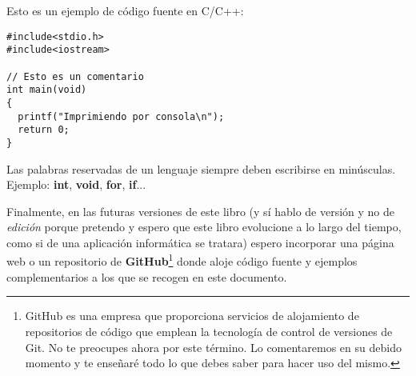 \begin{ejemplo}
Esto es un ejemplo de código fuente en C/C++:
\begin{lstlisting}
#include<stdio.h>
#include<iostream>
    
// Esto es un comentario
int main(void)
{
  printf("Imprimiendo por consola\n");
  return 0;
}
\end{lstlisting}
\end{ejemplo}

\begin{consejo}
Las palabras reservadas de un lenguaje siempre deben escribirse en minúsculas. Ejemplo: \textbf{int}, \textbf{void}, \textbf{for}, \textbf{if}...
\end{consejo}

Finalmente, en las futuras versiones de este libro (y sí hablo de versión y no de \textit{edición} porque pretendo y espero que 
este libro evolucione a lo largo del tiempo, como si de una aplicación informática se tratara) espero incorporar una página web
o un repositorio de \textbf{GitHub}\footnote{GitHub es una empresa que proporciona servicios de alojamiento de repositorios de 
código que emplean la tecnología de control de versiones de Git. No te preocupes ahora por este término. Lo comentaremos
en su debido momento y te enseñaré todo lo que debes saber para hacer uso del mismo.} donde aloje código fuente y 
ejemplos complementarios a los que se recogen en este documento.
